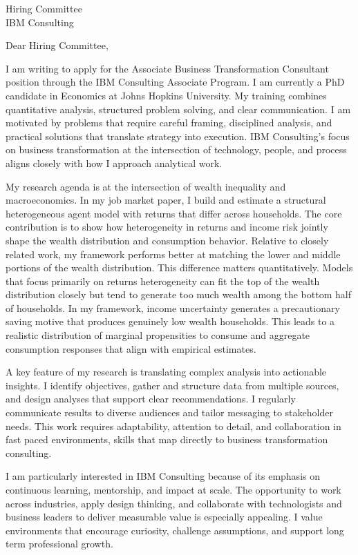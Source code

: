 \documentclass[11pt]{letter}
\begin{document}
\begin{letter}{Hiring Committee \\ IBM Consulting}

\opening{Dear Hiring Committee,}

I am writing to apply for the Associate Business Transformation Consultant position through the IBM Consulting Associate Program. I am currently a PhD candidate in Economics at Johns Hopkins University. My training combines quantitative analysis, structured problem solving, and clear communication. I am motivated by problems that require careful framing, disciplined analysis, and practical solutions that translate strategy into execution. IBM Consulting’s focus on business transformation at the intersection of technology, people, and process aligns closely with how I approach analytical work.

My research agenda is at the intersection of wealth inequality and macroeconomics. In my job market paper, I build and estimate a structural heterogeneous agent model with returns that differ across households. The core contribution is to show how heterogeneity in returns and income risk jointly shape the wealth distribution and consumption behavior. Relative to closely related work, my framework performs better at matching the lower and middle portions of the wealth distribution. This difference matters quantitatively. Models that focus primarily on returns heterogeneity can fit the top of the wealth distribution closely but tend to generate too much wealth among the bottom half of households. In my framework, income uncertainty generates a precautionary saving motive that produces genuinely low wealth households. This leads to a realistic distribution of marginal propensities to consume and aggregate consumption responses that align with empirical estimates.

A key feature of my research is translating complex analysis into actionable insights. I identify objectives, gather and structure data from multiple sources, and design analyses that support clear recommendations. I regularly communicate results to diverse audiences and tailor messaging to stakeholder needs. This work requires adaptability, attention to detail, and collaboration in fast paced environments, skills that map directly to business transformation consulting.

I am particularly interested in IBM Consulting because of its emphasis on continuous learning, mentorship, and impact at scale. The opportunity to work across industries, apply design thinking, and collaborate with technologists and business leaders to deliver measurable value is especially appealing. I value environments that encourage curiosity, challenge assumptions, and support long term professional growth.


\end{letter}
\end{document}
